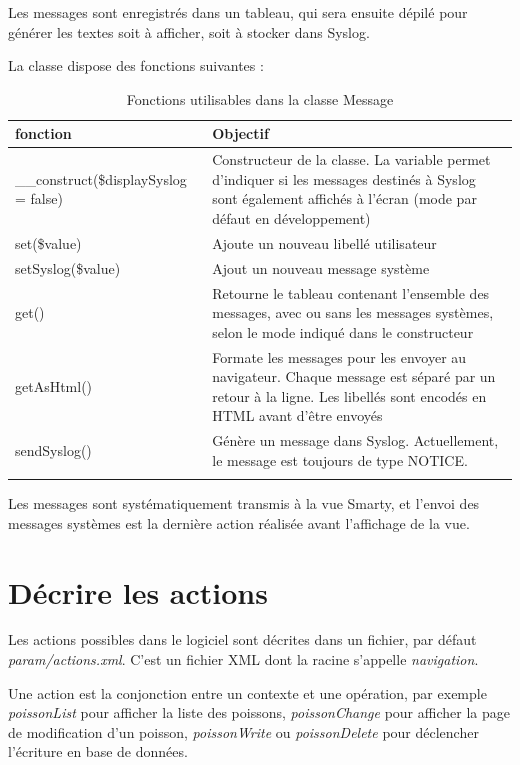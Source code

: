 Les messages sont enregistrés dans un tableau, qui sera ensuite dépilé pour générer les textes soit à afficher, soit à stocker dans Syslog.

La classe dispose des fonctions suivantes :
\begin{longtable}{|p{5cm}|p{8cm}|}
\hline
\textbf{fonction} & \textbf{Objectif} \\
\hline
\endhead
\_\_construct(\$displaySyslog = false) & Constructeur de la classe. La variable permet d'indiquer si les messages destinés à Syslog sont également affichés à l'écran (mode par défaut en développement) \\
\hline
set(\$value) & Ajoute un nouveau libellé utilisateur \\
\hline
setSyslog(\$value) & Ajout un nouveau message système \\
\hline
get() & Retourne le tableau contenant l'ensemble des messages, avec ou sans les messages systèmes, selon le mode indiqué dans le constructeur \\
\hline
getAsHtml() & Formate les messages pour les envoyer au navigateur. Chaque message est séparé par un retour à la ligne. Les libellés sont encodés en HTML avant d'être envoyés \\
\hline
sendSyslog() & Génère un message dans Syslog. Actuellement, le message est toujours de type NOTICE. \\
\hline

\caption{Fonctions utilisables dans la classe Message}
\end{longtable}

Les messages sont systématiquement transmis à la vue Smarty, et l'envoi des messages systèmes est la dernière action réalisée avant l'affichage de la vue.

\chapter{Décrire les actions}\label{labelxml}

Les actions possibles dans le logiciel sont décrites dans un fichier, par défaut \textit{param/actions.xml}. C'est un fichier XML dont la racine s'appelle \textit{navigation}. 

Une action est la conjonction entre un contexte et une opération, par exemple \textit{poissonList} pour afficher la liste des poissons, \textit{poissonChange} pour afficher la page de modification d'un poisson, \textit{poissonWrite} ou \textit{poissonDelete} pour déclencher l'écriture en base de données.

